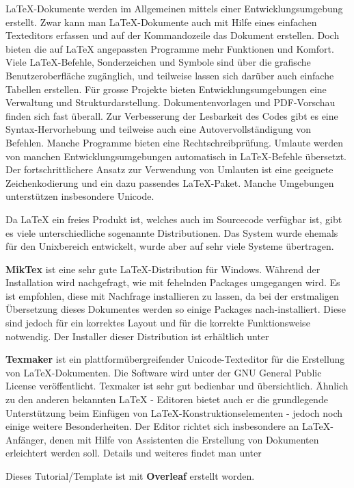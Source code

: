 LaTeX-Dokumente werden im Allgemeinen mittels einer Entwicklungsumgebung erstellt. Zwar kann man LaTeX-Dokumente auch mit Hilfe eines einfachen Texteditors erfassen und auf der Kommandozeile das Dokument erstellen. Doch bieten die auf LaTeX angepassten Programme mehr Funktionen und Komfort. Viele LaTeX-Befehle, Sonderzeichen und Symbole sind über die grafische Benutzeroberfläche zugänglich, und teilweise lassen sich darüber auch einfache Tabellen erstellen. Für grosse Projekte bieten Entwicklungsumgebungen eine Verwaltung und Strukturdarstellung. Dokumentenvorlagen und PDF-Vorschau finden sich fast überall. Zur Verbesserung der Lesbarkeit des Codes gibt es eine Syntax-Hervorhebung und teilweise auch eine Autovervollständigung von Befehlen. Manche Programme bieten eine Rechtschreibprüfung. Umlaute werden von manchen Entwicklungsumgebungen automatisch in LaTeX-Befehle übersetzt. Der fortschrittlichere Ansatz zur Verwendung von Umlauten ist eine geeignete Zeichenkodierung und ein dazu passendes LaTeX-Paket. Manche Umgebungen unterstützen insbesondere Unicode. 

Da LaTeX ein freies Produkt ist, welches auch im Sourcecode verfügbar ist, gibt es viele unterschiedliche sogenannte Distributionen. Das System wurde ehemals für den Unixbereich entwickelt, wurde aber auf sehr viele Systeme übertragen.

\textbf{MikTex} ist eine sehr gute LaTeX-Distribution für Windows. Während der Installation wird nachgefragt, wie mit fehelnden Packages umgegangen wird. Es ist empfohlen, diese mit Nachfrage installieren zu lassen, da bei der erstmaligen Übersetzung dieses Dokumentes werden so einige Packages nach-installiert. Diese sind jedoch für ein korrektes Layout und für die korrekte Funktionsweise notwendig. Der Installer dieser Distribution ist erhältlich unter  

\textbf{Texmaker} ist ein plattformübergreifender Unicode-Texteditor für die Erstellung von LaTeX-Dokumenten. Die Software wird unter der GNU General Public License ver\-öf\-fent\-licht. Texmaker ist sehr gut bedienbar und übersichtlich. Ähnlich zu den anderen bekannten LaTeX - Editoren bietet auch er die grundlegende Unterstützung beim Einfügen von LaTeX-Konstruktionselementen - jedoch noch einige weitere Besonderheiten. Der Editor richtet sich insbesondere an LaTeX-Anfänger, denen mit Hilfe von Assistenten die Erstellung von Dokumenten erleichtert werden soll. Details und weiteres findet man unter 

Dieses Tutorial/Template ist mit \textbf{Overleaf} erstellt worden. 

